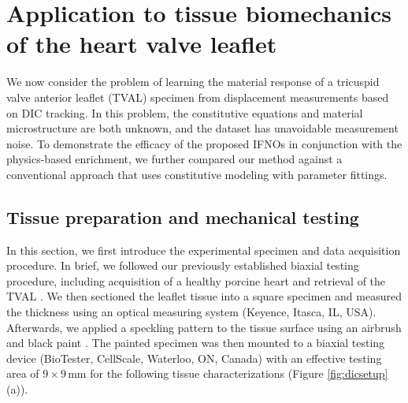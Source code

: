 \documentclass[twocolumn,10pt]{asme2ej}
\renewcommand{\~}{\tilde}
\renewcommand{\-}{\bar}
\newcommand{\8}{\infty}
\numberwithin{equation}{section}
\begin{document}
    

\section{Application to tissue biomechanics of the heart valve leaflet}\label{sec:setting}

We now consider the problem of learning the material response of a tricuspid valve anterior leaflet (TVAL) specimen from displacement measurements based on DIC tracking. In this problem, the constitutive equations and material microstructure are both unknown, and the dataset has unavoidable measurement noise. To demonstrate the efficacy of the proposed IFNOs in conjunction with the physics-based enrichment, we further compared our method against a conventional approach that uses constitutive modeling with parameter fittings.

\subsection{Tissue preparation and mechanical testing}\label{sec:DICexp}

In this section, we first introduce the experimental specimen and data acquisition procedure. In brief, we followed our previously established biaxial testing procedure, including acquisition of a healthy porcine heart and retrieval of the TVAL \cite{ross2019investigation,laurence2019investigation}. We then sectioned the leaflet tissue into a square specimen and measured the thickness using an optical measuring system (Keyence, Itasca, IL, USA). Afterwards, we applied a speckling pattern to the tissue surface using an airbrush and black paint \cite{zhang2004applications,lionello2014practical,palanca2016use}. The painted specimen was then mounted to a biaxial testing device (BioTester, CellScale, Waterloo, ON, Canada) with an effective testing area of $9\times9$\,mm for the following tissue characterizations (Figure  \ref{fig:dicsetup}(a)).
\end{document}
